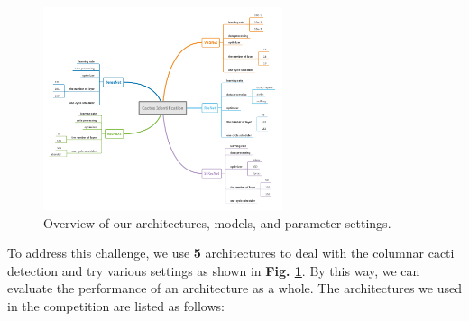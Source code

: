 \documentclass[10pt,twocolumn,letterpaper]{article}
\begin{document}
\begin{figure}[h]
\centering
\includegraphics[width=7cm]{overview.pdf}
\caption{Overview of our architectures, models, and parameter settings.}
\label{overview}
\end{figure}

To address this challenge, we use \textbf{5} architectures to deal with the columnar cacti detection and try various settings as shown in \textbf{Fig. \ref{overview}}. By this way, we can evaluate the performance of an architecture as a whole. The architectures we used in the competition are listed as follows:
\end{document}
